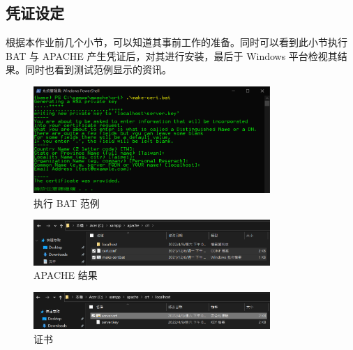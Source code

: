 \subsection{凭证设定}

根据本作业前几个小节，可以知道其事前工作的准备。同时可以看到此小节执行 BAT 与 APACHE 产生凭证后，对其进行安装，最后于 Windows 平台检视其结果。同时也看到测试范例显示的资讯。


\begin{figure}[htb]
\centering 
\includegraphics[width=0.80\textwidth]{img/ch1s2m4.png} 
\caption{执行 BAT 范例}
\label{Test}
\end{figure}

\begin{figure}[htb]
\centering 
\includegraphics[width=0.80\textwidth]{img/ch1s2m5.png} 
\caption{APACHE 结果}
\label{Test}
\end{figure}

\begin{figure}[htb]
\centering 
\includegraphics[width=0.80\textwidth]{img/ch1s2m6.png} 
\caption{证书}
\label{Test}
\end{figure}

